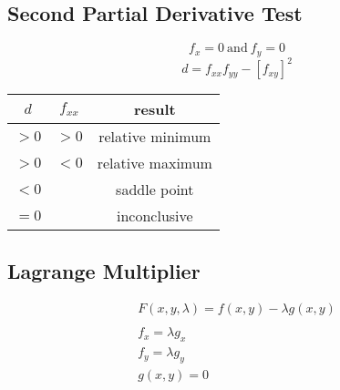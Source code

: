 \documentclass[letterpaper,12pt,fleqn]{article}
\renewcommand{\l}{\lambda}
\begin{document}
\vspace{0.5in}

\begin{minipage}[t]{3in}
  \subsection*{Second Partial Derivative Test}

  \[f_x=0\ \text{and}\ f_y=0\]
  \[d=f_{xx}f_{yy}-[f_{xy}]^2\]
  \begin{tabular}{c|c|c}
    \(d\) & \(f_{xx}\) & result \\
    \hline
    \(>0\) & \(>0\) & relative minimum \\
    \(>0\) & \(<0\) & relative maximum \\
    \(<0\) & & saddle point \\
    \(=0\) & & inconclusive
  \end{tabular}
\end{minipage}
\begin{minipage}[t]{3in}
\subsection*{Lagrange Multiplier}

\begin{gather*}
F(x,y,\l)=f(x,y)-\l g(x,y) \\
\\
f_x=\l g_x \\
f_y=\l g_y \\
g(x,y)=0
\end{gather*}
\end{minipage}
\end{document}
